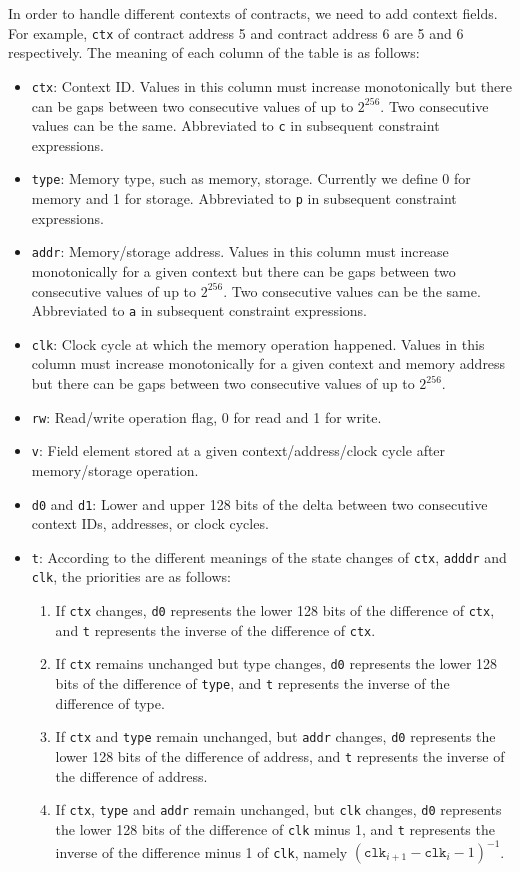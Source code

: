 In order to handle different contexts of contracts, we need to add context fields. For example, \verb|ctx| of contract address 5 and contract address 6 are 5 and 6 respectively. The meaning of each column of the table is as follows:
\begin{itemize}
\item \verb|ctx|: Context ID. Values in this column must increase monotonically but there can be gaps between two consecutive values of up to $2^{256}$. Two consecutive values can be the same. Abbreviated to \verb|c| in subsequent constraint expressions.
\item \verb|type|: Memory type, such as memory, storage. Currently we define 0 for memory and 1 for storage. Abbreviated to \verb|p| in subsequent constraint expressions.
\item \verb|addr|: Memory/storage address. Values in this column must increase monotonically for a given context but there can be gaps between two consecutive values of up to $2^{256}$. Two consecutive values can be the same. Abbreviated to \verb|a| in subsequent constraint expressions.
\item \verb|clk|: Clock cycle at which the memory operation happened. Values in this column must increase monotonically for a given context and memory address but there can be gaps between two consecutive values of up to $2^{256}$.
\item \verb|rw|: Read/write operation flag, 0 for read and 1 for write.
\item \verb|v|: Field element stored at a given context/address/clock cycle after memory/storage operation.
\item \verb|d0| and \verb|d1|: Lower and upper 128 bits of the delta between two consecutive context IDs, addresses, or clock cycles.
\item \verb|t|: According to the different meanings of the state changes of \verb|ctx|, \verb|adddr| and \verb|clk|, the priorities are as follows:
    \begin{enumerate}
        \item If \verb|ctx| changes, \verb|d0| represents the lower 128 bits of the difference of \verb|ctx|, and \verb|t| represents the inverse of the difference of \verb|ctx|.
        \item If \verb|ctx| remains unchanged but type changes, \verb|d0| represents the lower 128 bits of the difference of \verb|type|, and \verb|t| represents the inverse of the difference of type.
        \item If \verb|ctx| and \verb|type| remain unchanged, but \verb|addr| changes, \verb|d0| represents the lower 128 bits of the difference of address, and \verb|t| represents the inverse of the difference of address.
        \item If \verb|ctx|, \verb|type| and \verb|addr| remain unchanged, but \verb|clk| changes, \verb|d0| represents the lower 128 bits of the difference of \verb|clk| minus 1, and \verb|t| represents the inverse of the difference minus 1 of \verb|clk|, namely $(\texttt{clk}_{i+1}-\texttt{clk}_i-1)^{-1}$.
    \end{enumerate}
\end{itemize}

